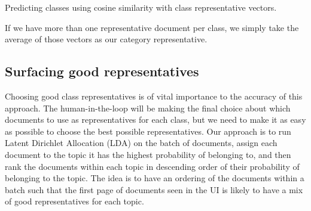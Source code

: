 \begin{algorithm}[!h]
\caption{Predicting classes using cosine similarity with class representative vectors.}
\label{algo:classification}
\end{algorithm}

If we have more than one representative document per class, we simply take the average of those vectors as our category representative.

\subsection{Surfacing good representatives}
Choosing good class representatives is of vital importance to the accuracy of this approach. The human-in-the-loop will be making the final choice about which documents to use as representatives for each class, but we need to make it as easy as possible to choose the best possible representatives. Our approach is to run Latent Dirichlet Allocation (LDA) on the batch of documents, assign each document to the topic it has the highest probability of belonging to, and then rank the documents within each topic in descending order of their probability of belonging to the topic. The idea is to have an ordering of the documents within a batch such that the first page of documents seen in the UI is likely to have a mix of good representatives for each topic.
